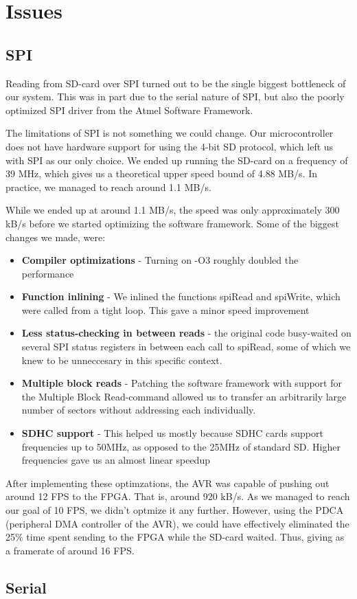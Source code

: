 \section{Issues}

\subsection{SPI}
\label{sec:avr-spi-issues}
Reading from SD-card over SPI turned out to be the single biggest bottleneck of
our system. This was in part due to the serial nature of SPI, but also the poorly optimized SPI driver from the Atmel Software Framework.

The limitations of SPI is not something we could change. Our microcontroller does not have hardware support for using the 4-bit SD protocol, which left us with SPI as our only choice. We ended up running the SD-card on a frequency of 39 MHz, which gives us a theoretical upper speed bound of 4.88 MB/s. In practice, we managed to reach around 1.1 MB/s.

While we ended up at around 1.1 MB/s, the speed was only approximately 300 kB/s before we started optimizing the software framework. Some of the biggest changes we made, were:
\begin{itemize}
	\item \textbf{Compiler optimizations} - Turning on -O3 roughly doubled the performance
	\item \textbf{Function inlining} - We inlined the functions spiRead and spiWrite, which were called from a tight loop. This gave a minor speed improvement
	\item \textbf{Less status-checking in between reads} - the original code busy-waited on several SPI status registers in between each call to spiRead, some of which we knew to be unneccesary in this specific context.
	\item \textbf{Multiple block reads} - Patching the software framework with support for the Multiple Block Read-command allowed us to transfer an arbitrarily large number of sectors without addressing each individually.
	\item \textbf{SDHC support} - This helped us mostly because SDHC cards support frequencies up to 50MHz, as opposed to the 25MHz of standard SD. Higher frequencies gave us an almost linear speedup
\end{itemize}

After implementing these optimzations, the AVR was capable of pushing out around 12 FPS to the FPGA. That is, around 920 kB/s. As we managed to reach our goal of 10 FPS, we didn't optmize it any further. However, using the PDCA (peripheral DMA controller of the AVR), we could have effectively eliminated the 25\% time spent sending to the FPGA while the SD-card waited. Thus, giving as a framerate of around 16 FPS.

\subsection{Serial}


